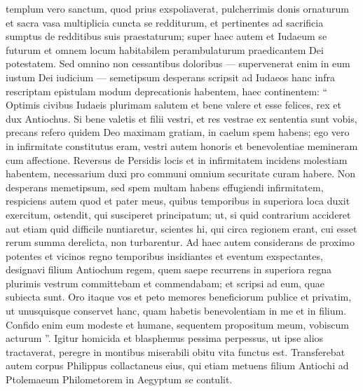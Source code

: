 \begin{biblechapter}
\begin{biblechapter}
\begin{biblechapter}
\begin{biblechapter}
\begin{biblechapter}
\begin{biblechapter}
\begin{biblechapter}
\begin{biblechapter}
\begin{biblechapter}
\verse templum vero sanctum, quod prius exspoliaverat, pulcherrimis donis ornaturum et sacra vasa multiplicia cuncta se redditurum, et pertinentes ad sacrificia sumptus de redditibus suis praestaturum; 
\verse super haec autem et Iudaeum se futurum et omnem locum habitabilem perambulaturum praedicantem Dei potestatem.
 \verse Sed omnino non cessantibus doloribus — supervenerat enim in eum iustum Dei iudicium — semetipsum desperans scripsit ad Iudaeos hanc infra rescriptam epistulam modum deprecationis habentem, haec continentem: 
\verse “ Optimis civibus Iudaeis plurimam salutem et bene valere et esse felices, rex et dux Antiochus. 
\verse Si bene valetis et filii vestri, et res vestrae ex sententia sunt vobis, precans refero quidem Deo maximam gratiam, in caelum spem habens; 
\verse ego vero in infirmitate constitutus eram, vestri autem honoris et benevolentiae memineram cum affectione. Reversus de Persidis locis et in infirmitatem incidens molestiam habentem, necessarium duxi pro communi omnium securitate curam habere. 
 \verse Non desperans memetipsum, sed spem multam habens effugiendi infirmitatem, 
 \verse respiciens autem quod et pater meus, quibus temporibus in superiora loca duxit exercitum, ostendit, qui susciperet principatum; 
\verse ut, si quid contrarium accideret aut etiam quid difficile nuntiaretur, scientes hi, qui circa regionem erant, cui esset rerum summa derelicta, non turbarentur. 
\verse Ad haec autem considerans de proximo potentes et vicinos regno temporibus insidiantes et eventum exspectantes, designavi filium Antiochum regem, quem saepe recurrens in superiora regna plurimis vestrum committebam et commendabam; et scripsi ad eum, quae subiecta sunt. 
\verse Oro itaque vos et peto memores beneficiorum publice et privatim, ut unusquisque conservet hanc, quam habetis benevolentiam in me et in filium. 
\verse Confido enim eum modeste et humane, sequentem propositum meum, vobiscum acturum ”.
 \verse Igitur homicida et blasphemus pessima perpessus, ut ipse alios tractaverat, peregre in montibus miserabili obitu vita functus est. 
\verse Transferebat autem corpus Philippus collactaneus eius, qui etiam metuens filium Antiochi ad Ptolemaeum Philometorem in Aegyptum se contulit.
 

\end{biblechapter}
\end{biblechapter}
\end{biblechapter}
\end{biblechapter}
\end{biblechapter}
\end{biblechapter}
\end{biblechapter}
\end{biblechapter}
\end{biblechapter}
